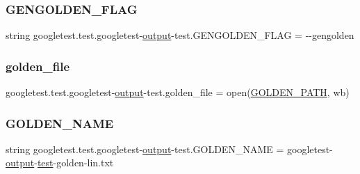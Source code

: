 \subsubsection{\texorpdfstring{GENGOLDEN\_FLAG}{GENGOLDEN\_FLAG}}
{\footnotesize\ttfamily string googletest.\+test.\+googletest-\/\mbox{\hyperlink{namespacegoogletest_1_1test_1_1googletest-output-test_a6773c2217ae4694b4db5610620562437}{output}}-\/test.\+G\+E\+N\+G\+O\+L\+D\+E\+N\+\_\+\+F\+L\+AG = \textquotesingle{}-\/-\/gengolden\textquotesingle{}}

\mbox{\label{namespacegoogletest_1_1test_1_1googletest-output-test_a43fd0a2352f415deb258d9b137ac371b}} 
\subsubsection{\texorpdfstring{golden\_file}{golden\_file}}
{\footnotesize\ttfamily googletest.\+test.\+googletest-\/\mbox{\hyperlink{namespacegoogletest_1_1test_1_1googletest-output-test_a6773c2217ae4694b4db5610620562437}{output}}-\/test.\+golden\+\_\+file = open(\mbox{\hyperlink{namespacegoogletest_1_1test_1_1googletest-output-test_a8aa8d805d7dfff2638f6faeb8a25cd43}{G\+O\+L\+D\+E\+N\+\_\+\+P\+A\+TH}}, \textquotesingle{}wb\textquotesingle{})}

\mbox{\label{namespacegoogletest_1_1test_1_1googletest-output-test_a48529ecdda438cb5f92cdab8f181b6ab}} 
\subsubsection{\texorpdfstring{GOLDEN\_NAME}{GOLDEN\_NAME}}
{\footnotesize\ttfamily string googletest.\+test.\+googletest-\/\mbox{\hyperlink{namespacegoogletest_1_1test_1_1googletest-output-test_a6773c2217ae4694b4db5610620562437}{output}}-\/test.\+G\+O\+L\+D\+E\+N\+\_\+\+N\+A\+ME = \textquotesingle{}googletest-\/\mbox{\hyperlink{namespacegoogletest_1_1test_1_1googletest-output-test_a6773c2217ae4694b4db5610620562437}{output}}-\/\mbox{\hyperlink{_mutual_8h_a707ee03719e99670bf6cfdfd897b8456}{test}}-\/golden-\/lin.\+txt\textquotesingle{}}


